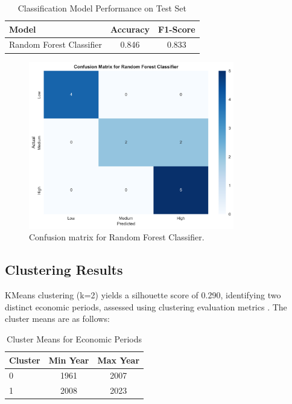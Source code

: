 \documentclass[12pt]{article}
\begin{document}
	\begin{table}[H]
		\centering
		\caption{Classification Model Performance on Test Set}
		\begin{tabular}{lcc}
			\toprule
			Model & Accuracy & F1-Score \\
			\midrule
			Random Forest Classifier & 0.846 & 0.833 \\
			\bottomrule
		\end{tabular}
		\label{tab:classification_results}
	\end{table}
	
	\begin{figure}[H]
		\centering
		\includegraphics[width=0.8\textwidth]{../figures/confusion_matrix.png}
		\caption{Confusion matrix for Random Forest Classifier.}
		\label{fig:confusion_matrix}
	\end{figure}
	
	\subsection{Clustering Results}
	KMeans clustering (k=2) yields a silhouette score of 0.290, identifying two distinct economic periods, assessed using clustering evaluation metrics \citep{hastie2009}. The cluster means are as follows:
	
	\begin{table}[H]
		\centering
		\caption{Cluster Means for Economic Periods}
		\begin{tabular}{lcc}
			\toprule
			Cluster & Min Year & Max Year \\
			\midrule
			0 & 1961 & 2007 \\
			1 & 2008 & 2023 \\
			\bottomrule
		\end{tabular}
		\label{tab:cluster_means}
	\end{table}
	
\end{document}
